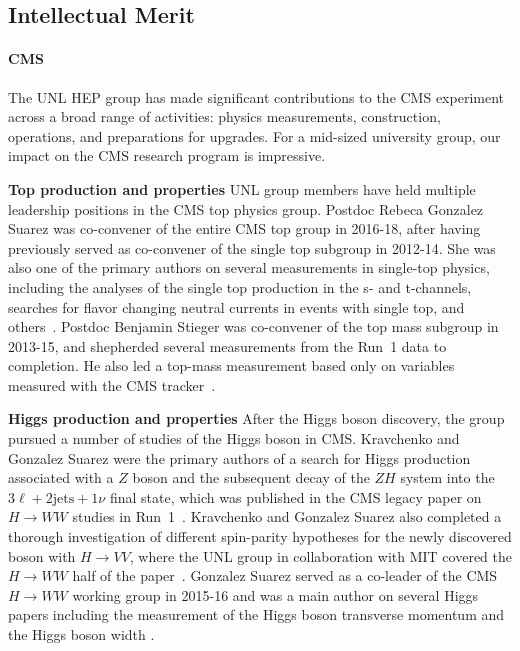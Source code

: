 \subsection{Intellectual Merit}

\paragraph{CMS}
The UNL HEP group has made significant contributions to the CMS experiment across a broad range of activities: physics measurements, construction, operations, and preparations for upgrades. 
For a mid-sized university group, our impact on the CMS research program is impressive.

{\bf Top production and properties} 
UNL group members have held multiple leadership positions in the CMS top
physics group.  Postdoc Rebeca Gonzalez Suarez was co-convener of the entire CMS top group
in 2016-18, after having previously served as co-convener of the single top
subgroup in 2012-14.  She was also one of the primary authors on several
measurements in single-top physics, including the analyses of the single
top production in the s- and t-channels, searches for flavor changing
neutral currents in events with single top, and
others~\cite{bib:single-top-papers}.  Postdoc Benjamin Stieger was co-convener of the top
mass subgroup in 2013-15, and shepherded several measurements from the
Run~1 data to completion.  He also led a top-mass measurement based only on
variables measured with the CMS tracker~\cite{bib:tracker-top-mass}.

{\bf Higgs production and properties}
After the Higgs boson discovery, the group pursued a number of studies of the Higgs boson in CMS. Kravchenko and Gonzalez Suarez were the primary authors of a search for Higgs production associated with a $Z$ boson and the subsequent decay of the $ZH$ system into the $3\ell+2\text{jets}+1\nu$ final state,  which was published in the CMS legacy paper on $H\rightarrow WW$ studies in Run~1~\cite{bib:HWWlegacy}. Kravchenko and Gonzalez Suarez also completed a thorough investigation of different spin-parity hypotheses for the newly discovered boson with $H\rightarrow VV$, where the UNL group in collaboration with MIT covered the $H\rightarrow WW$ half of the paper~\cite{bib:higgs-spin-parity}. Gonzalez Suarez served as a co-leader of the CMS $H\to WW$ working group in 2015-16 and was a main author on several Higgs papers including the measurement of the Higgs boson transverse momentum \cite{bib:HWW-pT} and the Higgs boson width \cite{bib:Higgs-width}.

